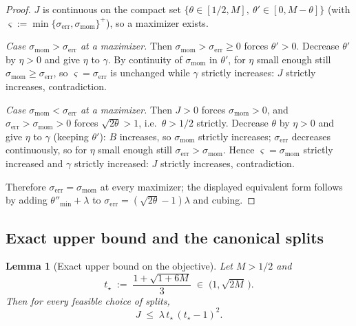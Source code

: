 \documentclass[11pt,a4paper]{article}
\theoremstyle{plain}
\newtheorem{lemma}{Lemma}
\theoremstyle{definition}
\newcommand{\serr}{\sigma_{\mathrm{err}}}
\newcommand{\smom}{\sigma_{\mathrm{mom}}}
\newcommand{\tstar}{t_\star}
\newcommand{\thetamin}{\theta''_{\min}}
\begin{document}
\begin{proof}
$J$ is continuous on the compact set
$\{\theta\in[1/2,M],\ \theta'\in[0,M-\theta]\}$ (with
$\varsigma := \min\{\serr,\smom\}^+$), so a maximizer exists.

\emph{Case $\smom > \serr$ at a maximizer.} Then
$\smom > \serr \ge 0$ forces $\theta' > 0$. Decrease $\theta'$ by
$\eta>0$ and give $\eta$ to $\gamma$. By continuity of $\smom$ in
$\theta'$, for $\eta$ small enough still $\smom \ge \serr$, so
$\varsigma = \serr$ is unchanged while $\gamma$ strictly increases:
$J$ strictly increases, contradiction.

\emph{Case $\smom < \serr$ at a maximizer.} Then $J>0$ forces
$\smom>0$, and $\serr > \smom > 0$ forces $\sqrt{2\theta}>1$, i.e.\
$\theta > 1/2$ strictly. Decrease $\theta$ by $\eta>0$ and give $\eta$ to
$\gamma$ (keeping $\theta'$): $B$ increases, so $\smom$ strictly increases;
$\serr$ decreases continuously, so for $\eta$ small enough still
$\serr > \smom$. Hence $\varsigma = \smom$ strictly increased and $\gamma$
strictly increased: $J$ strictly increases, contradiction.

Therefore $\serr = \smom$ at every maximizer; the displayed equivalent form
follows by adding $\thetamin+\lambda$ to $\serr = (\sqrt{2\theta}-1)\lambda$
and cubing.
\end{proof}

\subsection{Exact upper bound and the canonical splits}

\begin{lemma}[Exact upper bound on the objective]\label{lem:UB}
Let $M > 1/2$ and
\begin{equation}\label{eq:tstar}
\tstar \;:=\; \frac{1+\sqrt{1+6M}}{3} \;\in\; \big(1,\sqrt{2M}\,\big).
\end{equation}
Then for \emph{every} feasible choice of splits,
\begin{equation}\label{eq:UB}
J \;\le\; \lambda\,\tstar\,(\tstar-1)^2 .
\end{equation}
\end{lemma}
\end{document}
